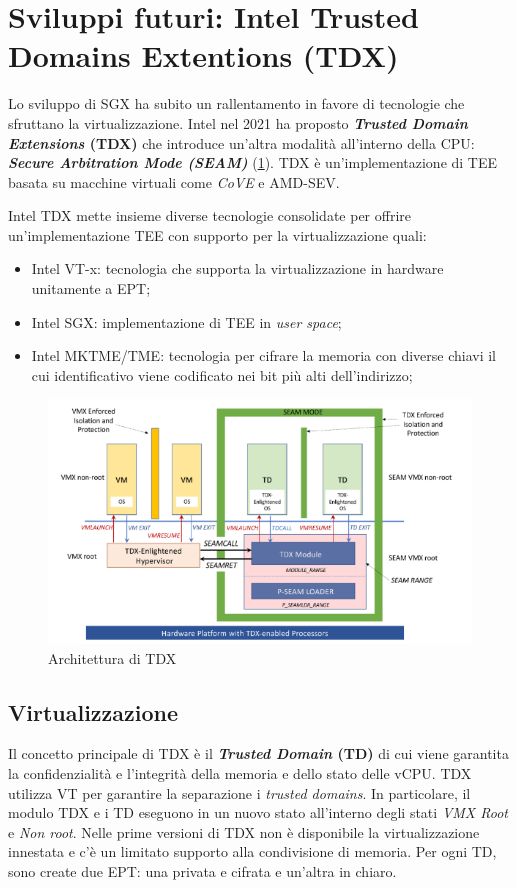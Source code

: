 \documentclass{article}
\begin{document}
\clearpage
\section{Sviluppi futuri: Intel Trusted Domains Extentions (TDX)}
Lo sviluppo di SGX ha subito un rallentamento in favore di tecnologie che sfruttano la virtualizzazione. Intel nel 2021 ha proposto \textbf{\textit{Trusted Domain Extensions } (TDX)} che introduce un'altra modalità all'interno della CPU: \textbf{\textit{Secure Arbitration Mode (SEAM)}} (\cref{fig:tdx-architecture}). TDX è un'implementazione di TEE basata su macchine virtuali come \textit{CoVE} e AMD-SEV.

Intel TDX mette insieme diverse tecnologie consolidate per offrire un'implementazione TEE con supporto per la virtualizzazione\cite{Cheng2024} quali:
\begin{itemize}
  \item Intel VT-x: tecnologia che supporta la virtualizzazione in hardware unitamente a EPT;
  \item Intel SGX: implementazione di TEE in \textit{user space};
  \item Intel MKTME/TME: tecnologia per cifrare la memoria con diverse chiavi il cui identificativo viene codificato nei bit più alti dell'indirizzo;
\end{itemize}

\begin{figure}[h]
  \begin{center}
    \includegraphics[width=.65\textwidth]{figures/tdx-architecture.png}
  \end{center}
  \caption{Architettura di TDX}\label{fig:tdx-architecture}
\end{figure}

\subsection{Virtualizzazione}
Il concetto principale di TDX è il \textbf{\textit{Trusted Domain} (TD)} di cui viene garantita la confidenzialità e l'integrità della memoria e dello stato delle vCPU. TDX utilizza VT per garantire la separazione i \textit{trusted domains}. In particolare, il modulo TDX e i TD eseguono in un nuovo stato all'interno degli stati \textit{VMX Root} e \textit{Non root}. Nelle prime versioni di TDX non è disponibile la virtualizzazione innestata e c'è un limitato supporto alla condivisione di memoria. Per ogni TD, sono create due EPT: una privata e cifrata e un'altra in chiaro.
\end{document}

